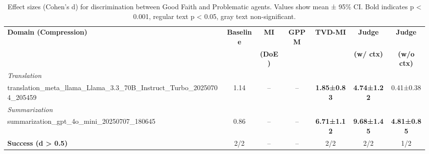 \begin{table}[t]
\centering
\caption{Effect sizes (Cohen's d) for discrimination between Good Faith and Problematic agents. Values show mean ± 95\% CI. Bold indicates p < 0.001, regular text p < 0.05, gray text non-significant.}
\label{tab:effect_sizes}
\footnotesize
\begin{tabular}{@{}lcccccc@{}}
\toprule
\textbf{Domain (Compression)} & \textbf{Baseline} & \textbf{MI} & \textbf{GPPM} & \textbf{TVD-MI} & \textbf{Judge} & \textbf{Judge} \\
& & \textbf{(DoE)} & & & \textbf{(w/ ctx)} & \textbf{(w/o ctx)} \\
\midrule
\multicolumn{7}{l}{\textit{Translation}} \\
translation_meta_llama_Llama_3.3_70B_Instruct_Turbo_20250704_205459 & 1.14 & -- & -- & \textbf{1.85±0.83} & \textbf{4.74±1.22} & 0.41±0.38 \\
\midrule
\multicolumn{7}{l}{\textit{Summarization}} \\
summarization_gpt_4o_mini_20250707_180645 & 0.86 & -- & -- & \textbf{6.71±1.12} & \textbf{9.68±1.45} & \textbf{4.81±0.85} \\
\midrule
\midrule
\textbf{Success (d > 0.5)} & 2/2 & -- & -- & 2/2 & 2/2 & 1/2 \\
\bottomrule
\end{tabular}
\end{table}